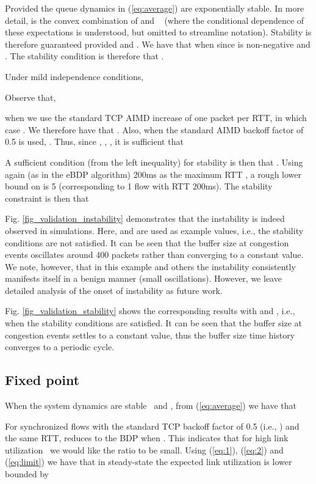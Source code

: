 \documentclass[10pt,twocolumn, journal]{IEEEtran}
\def\DLaddition#1{\noindent\ {\color{black} #1}}
\begin{document}
Provided   the queue dynamics in (\ref{eq:average}) are
exponentially stable.  In more detail,  is the convex combination of
 and \DLaddition{(where the conditional dependence of these expectations is understood, but omitted to streamline notation)}.  Stability is therefore guaranteed provided
 and .  We have that 
when  since  is non-negative and .   The stability
condition is therefore that .

Under mild independence conditions,

Observe that,

when we use the standard TCP AIMD increase of one packet per RTT, in which case .  We therefore have that . Also, when the
standard AIMD backoff factor of 0.5 is used, . Thus, since ,
, , it is sufficient that

A sufficient condition (from the left inequality) for stability is then that . Using again (as in the eBDP algorithm) 200ms as the maximum RTT , a rough
lower bound on  is 5 (corresponding to 1 flow with RTT 200ms).  The stability
constraint is then that


Fig. \ref{fig_validation_instability} demonstrates that the instability is indeed
observed in simulations. Here,  and  are used as example values, i.e., the
stability conditions are not satisfied. It can be seen that the buffer size at congestion
events oscillates around 400 packets rather than converging to a constant value. We note,
however, that in this example and others the instability consistently manifests itself in
a benign manner (small oscillations).  However, we leave detailed analysis of the onset
of instability as future work.

Fig. \ref{fig_validation_stability} shows the corresponding results with  and
, i.e., when the stability conditions are satisfied. It can be seen that the buffer
size at congestion events settles to a constant value, thus the buffer size time history
converges to a periodic cycle.


\subsection{Fixed point}\label{subsec_fixed_point}

When the system dynamics are stable\DLaddition{and }, from (\ref{eq:average}) we have that

For synchronized flows with the standard TCP backoff factor of 0.5 (i.e.,
) and the same RTT, 
reduces to the BDP when . This indicates that for high link utilization\DLaddition{we would like}
the ratio  to be small.    Using (\ref{eq:1}), (\ref{eq:2}) and
(\ref{eq:limit}) we have that in steady-state the expected link utilization is lower
bounded by
\end{document}
